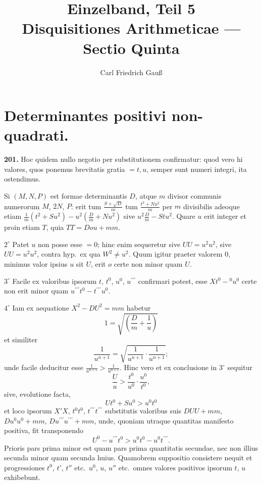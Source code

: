 \documentclass[12pt,a4paper]{article}
\title{\textbf{Einzelband, Teil 5}\\[0.5em]\large Disquisitiones Arithmeticae --- Sectio Quinta}
\author{Carl Friedrich Gau\ss}
\date{}
\theoremstyle{plain}
\theoremstyle{definition}
\theoremstyle{remark}
\begin{document}
\maketitle
\thispagestyle{empty}


\section*{Determinantes positivi non-quadrati.}

\textbf{201.}
Hoc quidem nullo negotio per substitutionem confirmatur: quod vero hi valores, quos ponemus brevitatis gratia $=t,u$, semper sunt numeri integri, ita ostendimus.

Si $(M,N,P)$ est formae determinantis $D$, atque $m$ divisor communis numerorum $M$, $2N$, $P$: erit tum $\frac{S+\sqrt{D}}{m}$ tum $\frac{t^2+Nu^2}{m}$ per $m$ divisibilis adeoque etiam $\frac{1}{m}(t^2+Su^2)-u^2(\frac{D}{m}+Nu^2)$ sive $u^2\frac{D}{m}-Stu^2$. Quare $u$ erit integer et proin etiam $T$, quia $TT = Dou+mm$.

$2^\circ$ Patet $u$ non posse esse $=0$; hinc enim sequeretur sive $UU=u^2u^2$, sive $UU=u^2u^2$, contra hyp.\ ex qua $W^2 \neq u^2$. Quum igitur praeter valorem $0$, minimus valor ipsius $u$ sit $U$, erit $o$ certe non minor quam $U$.

$3^\circ$ Facile ex valoribus ipsorum $t$, $t^0$, $u^0$, $u^{\prime\prime\prime}$ confirmari potest, esse $Xt^0-{}^0u^0$ certe non erit minor quam $u^{\prime\prime\prime}t^0-t^{\prime\prime\prime}u^0$.

$4^\circ$ Iam ex aequatione $X^2-DU^2=mm$ habetur
\[
1 = \sqrt{\left(\frac{D}{m}+\frac{1}{u}\right)}
\]
et similiter
\[
\frac{1}{u^{n+1}} = \sqrt{\frac{1}{u^{n+1}}\cdot\frac{1}{u^{n+1}}};
\]
unde facile deducitur esse $\frac{1}{u^{n+1}} > \frac{1}{u^{n+1}}$. Hinc vero et ex conclusione in $3^\circ$ sequitur
\[
\frac{U}{u} > \frac{t^0}{u^0} \cdot \frac{u^0}{t^0},
\]
sive, evolutione facta,
\[
Ut^0 + Su^0 > u^0t^0
\]
et loco ipsorum $X'X$, $t^0t^0$, $t^{\prime\prime\prime}t^{\prime\prime\prime}$ substitutis valoribus suis $DUU+mm$, $Du^0u^0+mm$, $Du^{\prime\prime\prime}u^{\prime\prime\prime}+mm$, unde, quoniam utraque quantitas manifesto positiva, fit transponendo
\[
U^0 - u^{\prime\prime\prime}t^0 > u^0t^0 - u^0t^{\prime\prime\prime}.
\]
Prioris pars prima minor est quam pars prima quantitatis secundae, nec non illius secunda minor quam secunda huius. Quamobrem suppositio consistere nequit et progressiones $t^0$, $t'$, $t''$ etc.\ $u^0$, $u$, $u''$ etc.\ omnes valores positivos ipsorum $t$, $u$ exhibebunt.
\end{document}

